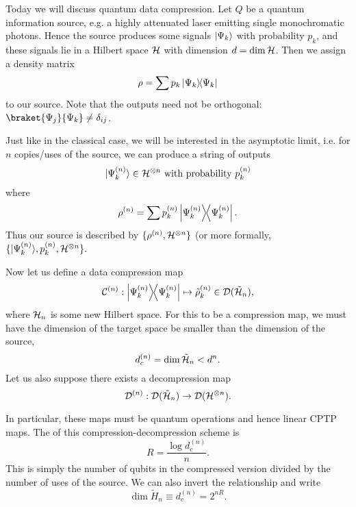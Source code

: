Today we will discuss quantum data compression. Let $Q$ be a quantum information source, e.g. a highly attenuated laser emitting single monochromatic photons. Hence the source produces some signals $\lvert\Psi_k\rangle$ with probability $p_k$, and these signals lie in a Hilbert space $\mathcal H$ with dimension $d=\dim\mathcal H$. Then we assign a density matrix
\begin{equation}
    \rho=\sum p_k \left\lvert{\Psi_k}\middle\rangle\!\middle\langle{\Psi_k}\right\rvert
\end{equation}
to our source. Note that the outputs need not be orthogonal: $\braket{\Psi_j}{\Psi_k}\neq \delta_{ij}$.

Just like in the classical case, we will be interested in the asymptotic limit, i.e. for $n$ copies/uses of the source, we can produce a string of outputs
\begin{equation}
    \lvert\Psi_{k}^{(n)}\rangle \in \mathcal H^{\otimes n} \text{ with probability }p_k^{(n)}
\end{equation}
where
\begin{equation}
    \rho^{(n)}=\sum p_k^{(n)}\left\lvert{\Psi_k^{(n)}}\middle\rangle\!\middle\langle{\Psi_k^{(n)}}\right\rvert.
\end{equation}
Thus our source is described by $\{\rho^{(n)},\mathcal H^{\otimes n}\}$ (or more formally, $\{\lvert\Psi_k^{(n)}\rangle,p_k^{(n)},\mathcal H^{\otimes n}\}.$

Now let us define a data compression map
\begin{equation}
    \mathcal{C}^{(n)}:\left\lvert{\Psi_k^{(n)}}\middle\rangle\!\middle\langle{\Psi_k^{(n)}}\right\rvert \mapsto \tilde \rho_k^{(n)} \in \mathcal{D}(\tilde {\mathcal H}_n),
\end{equation}
where $\mathcal H_n$ is some new Hilbert space. For this to be a compression map, we must have the dimension of the target space be smaller than the dimension of the source,
\begin{equation}
    d_c^{(n)}=\dim \tilde {\mathcal H}_n < d^n.
\end{equation}
Let us also suppose there exists a decompression map
\begin{equation}
    \mathcal{D}^{(n)}: \mathcal{D}(\tilde {\mathcal H}_n)\to \mathcal{D} (\mathcal H^{\otimes n}).
\end{equation}

In particular, these maps must be quantum operations and hence linear CPTP maps. The  of this compression-decompression scheme is
\begin{equation}
    R=\frac{\log d_c^{(n)}}{n}.
\end{equation}
This is simply the number of qubits in the compressed version divided by the number of uses of the source. We can also invert the relationship and write
\begin{equation}
    \dim \tilde H_n \equiv d_c^{(n)}=2^{nR}.
\end{equation}

